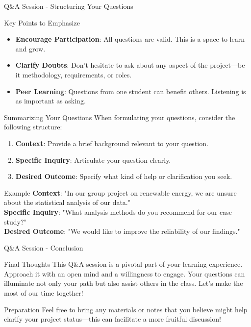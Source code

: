 \documentclass[aspectratio=169]{beamer}
\begin{document}
\begin{frame}[fragile]{Q\&A Session - Structuring Your Questions}
    \begin{block}{Key Points to Emphasize}
        \begin{itemize}
            \item \textbf{Encourage Participation}: All questions are valid. This is a space to learn and grow.
            \item \textbf{Clarify Doubts}: Don't hesitate to ask about any aspect of the project—be it methodology, requirements, or roles.
            \item \textbf{Peer Learning}: Questions from one student can benefit others. Listening is as important as asking.
        \end{itemize}
    \end{block}

    \begin{block}{Summarizing Your Questions}
        When formulating your questions, consider the following structure:
        \begin{enumerate}
            \item \textbf{Context}: Provide a brief background relevant to your question.
            \item \textbf{Specific Inquiry}: Articulate your question clearly.
            \item \textbf{Desired Outcome}: Specify what kind of help or clarification you seek.
        \end{enumerate}
    \end{block}

    \begin{block}{Example}
        \textbf{Context}: "In our group project on renewable energy, we are unsure about the statistical analysis of our data." \\
        \textbf{Specific Inquiry}: "What analysis methods do you recommend for our case study?" \\
        \textbf{Desired Outcome}: "We would like to improve the reliability of our findings."
    \end{block}
\end{frame}

\begin{frame}[fragile]{Q\&A Session - Conclusion}
    \begin{block}{Final Thoughts}
        This Q\&A session is a pivotal part of your learning experience. Approach it with an open mind and a willingness to engage. Your questions can illuminate not only your path but also assist others in the class. Let’s make the most of our time together!
    \end{block}

    \begin{block}{Preparation}
        Feel free to bring any materials or notes that you believe might help clarify your project status—this can facilitate a more fruitful discussion!
    \end{block}
\end{frame}
\end{document}
